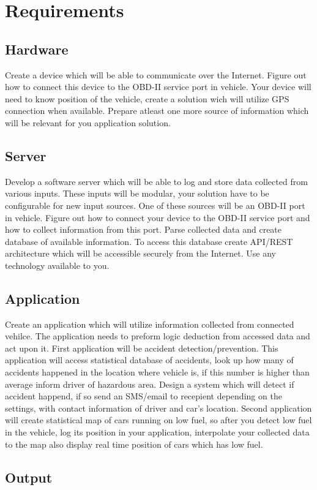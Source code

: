 \section{Requirements}

\subsection{Hardware}
Create a device which will be able to communicate over the Internet. Figure out how to connect this device to the OBD-II service port in vehicle. Your device will need to know position of the vehicle, create a solution wich will utilize GPS connection when available. Prepare atleast one more source of information which will be relevant for you application solution.
\subsection{Server}
Develop a software server which will be able to log and store data collected from various inputs. These inputs will be modular, your solution have to be configurable for new input sources. One of these sources will be an OBD-II port in vehicle. Figure out how to connect your device to the OBD-II service port and how to collect information from this port. Parse collected data and create database of available information. To access this database create API/REST architecture which will be accessible securely from the Internet. Use any technology available to you.
\subsection{Application}
Create an application which will utilize information collected from connected vehilce. The application needs to preform logic deduction from accessed data and act upon it. First application will  be accident detection/prevention. This application will access statistical database of accidents, look up how many of accidents happened in the location where vehicle is, if this number is higher than average inform driver of hazardous area. Design a system which will detect if accident happend, if so send an SMS/email to recepient depending on the settings, with contact information of driver and car's location. Second application will create statistical map of cars running on low fuel, so after you detect low fuel in the vehicle, log its position in your application, interpolate your collected data to the map also display real time position of cars which has low fuel.

\subsection{Output}


